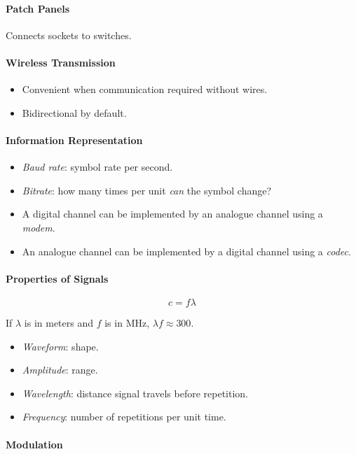 \documentclass[twocolumn,english]{article}
\begin{document}
\paragraph{Patch Panels}

Connects sockets to switches.

\paragraph{Wireless Transmission}
\begin{itemize}
\item Convenient when communication required without wires.
\item Bidirectional by default.
\end{itemize}

\paragraph{Information Representation}
\begin{itemize}
\item \emph{Baud rate}: symbol rate per second.
\item \emph{Bitrate}: how many times per unit \emph{can} the symbol change?
\end{itemize}
%
\begin{itemize}
\item A digital channel can be implemented by an analogue channel using
a \emph{modem}.
\item An analogue channel can be implemented by a digital channel using
a \emph{codec}.
\end{itemize}

\paragraph{Properties of Signals}

\[
c=f\lambda
\]

If $\lambda$ is in meters and $f$ is in MHz, $\lambda f\approx300$.
\begin{itemize}
\item \emph{Waveform}: shape.
\item \emph{Amplitude}: range.
\item \emph{Wavelength}: distance signal travels before repetition.
\item \emph{Frequency}: number of repetitions per unit time.
\end{itemize}

\paragraph{Modulation}
\end{document}
